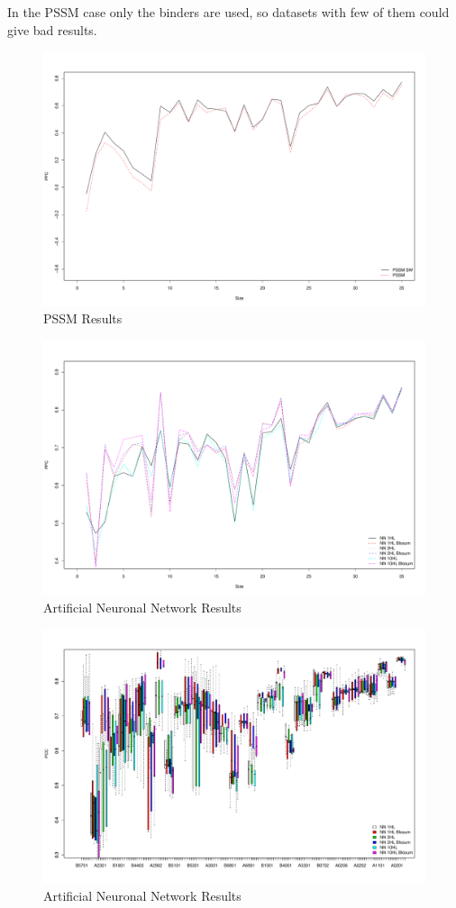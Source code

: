 In the PSSM case only the binders are used, so datasets with few of them could give bad results.

\begin{figure}[ht]
\begin{center}
\includegraphics[width=18cm]{fig/pssmLN1.pdf}
\caption{PSSM Results}\label{fig:pssm1}
\end{center}
\end{figure}

\begin{figure}[ht]
\begin{center}
\includegraphics[width=18cm]{fig/annLNzoom.pdf}
\caption{Artificial Neuronal Network Results}\label{fig:ann1}
\end{center}
\end{figure}

\begin{figure}[ht]
\begin{center}
\includegraphics[width=18cm]{fig/annBX1.pdf}
\caption{Artificial Neuronal Network Results}\label{fig:ann1}
\end{center}
\end{figure}
